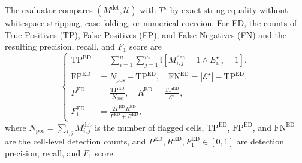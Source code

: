 \documentclass[conference]{IEEEtran}
\begin{document}
The evaluator compares $(M^{\mathrm{det}}, \mathcal{U})$ with $T^{\star}$ by exact string equality without whitespace stripping, case folding, or numerical coercion. For ED, the counts of True Positives (TP), False Positives (FP), and False Negatives (FN) and the resulting precision, recall, and $F_1$ score are
\begin{equation}
\label{eq:ed_metrics}
\left\{
\begin{aligned}
\mathrm{TP}^{\mathrm{ED}} &= \sum_{i=1}^{n}\sum_{j=1}^{m} \mathbb{I}\!\left[M_{i,j}^{\mathrm{det}} = 1 \land E_{i,j}^{\star} = 1\right], \\
\mathrm{FP}^{\mathrm{ED}} &= N_{\mathrm{pos}} - \mathrm{TP}^{\mathrm{ED}}, \quad
\mathrm{FN}^{\mathrm{ED}} = \left|\mathcal{E}^{\star}\right| - \mathrm{TP}^{\mathrm{ED}}, \\
P^{\mathrm{ED}} &= \frac{\mathrm{TP}^{\mathrm{ED}}}{N_{\mathrm{pos}}}, \quad
R^{\mathrm{ED}} = \frac{\mathrm{TP}^{\mathrm{ED}}}{\left|\mathcal{E}^{\star}\right|}, \\
F_1^{\mathrm{ED}} &= \frac{2 P^{\mathrm{ED}} R^{\mathrm{ED}}}{P^{\mathrm{ED}} + R^{\mathrm{ED}}},
\end{aligned}
\right.
\end{equation}
where $N_{\mathrm{pos}} = \sum_{i,j} M_{i,j}^{\mathrm{det}}$ is the number of flagged cells, $\mathrm{TP}^{\mathrm{ED}}$, $\mathrm{FP}^{\mathrm{ED}}$, and $\mathrm{FN}^{\mathrm{ED}}$ are the cell-level detection counts, and $P^{\mathrm{ED}}, R^{\mathrm{ED}}, F_1^{\mathrm{ED}} \in [0,1]$ are detection precision, recall, and $F_1$ score.
\end{document}
